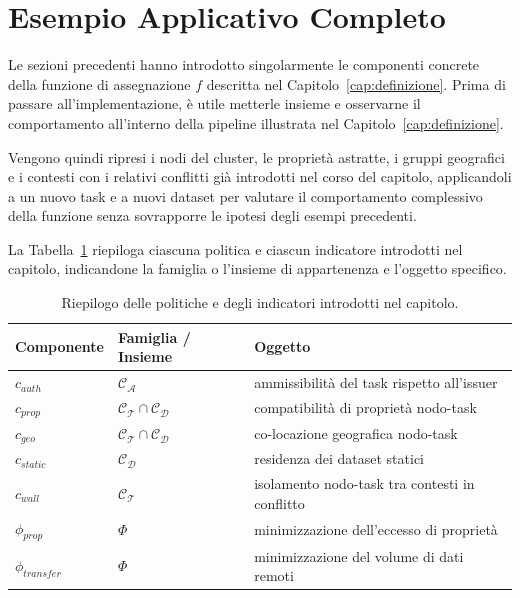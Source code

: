 
\section{Esempio Applicativo Completo}
\label{sec:sintesi_modello}

Le sezioni precedenti hanno introdotto singolarmente le componenti concrete della funzione di assegnazione $f$ descritta nel Capitolo~\ref{cap:definizione}. Prima di passare all'implementazione, è utile metterle insieme e osservarne il comportamento all'interno della pipeline illustrata nel Capitolo~\ref{cap:definizione}.

Vengono quindi ripresi i nodi del cluster, le proprietà astratte, i gruppi geografici e i contesti con i relativi conflitti già introdotti nel corso del capitolo, applicandoli a un nuovo task e a nuovi dataset per valutare il comportamento complessivo della funzione senza sovrapporre le ipotesi degli esempi precedenti.

La Tabella~\ref{tab:riepilogo_modello} riepiloga ciascuna politica e ciascun indicatore introdotti nel capitolo, indicandone la famiglia o l'insieme di appartenenza e l'oggetto specifico. 

\begin{table}[ht]
    \centering
    \begin{tabular}{lll}
        \toprule
        \textbf{Componente} & \textbf{Famiglia / Insieme} & \textbf{Oggetto} \\
        \midrule
        $c_{auth}$          & $\mathcal{C_A}$                    & ammissibilità del task rispetto all'issuer \\
        $c_{prop}$          & $\mathcal{C_T} \cap \mathcal{C_D}$ & compatibilità di proprietà nodo-task \\
        $c_{geo}$           & $\mathcal{C_T} \cap \mathcal{C_D}$ & co-locazione geografica nodo-task \\
        $c_{static}$        & $\mathcal{C_D}$                    & residenza dei dataset statici \\
        $c_{wall}$          & $\mathcal{C_T}$                    & isolamento nodo-task tra contesti in conflitto \\
        \midrule
        $\phi_{prop}$       & $\Phi$                             & minimizzazione dell'eccesso di proprietà \\
        $\phi_{transfer}$   & $\Phi$                             & minimizzazione del volume di dati remoti \\
        \bottomrule
    \end{tabular}
    \caption{Riepilogo delle politiche e degli indicatori introdotti nel capitolo.}
    \label{tab:riepilogo_modello}
\end{table}

